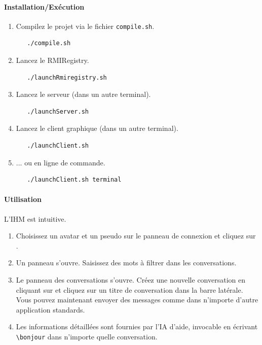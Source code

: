 \documentclass[11pt,dvipsnames,svgnames]{report}
\begin{document}
\paragraph*{Installation/Exécution}
\begin{enumerate}
\item Compilez le projet via le fichier \texttt{compile.sh}.
\begin{lstlisting}
   ./compile.sh
\end{lstlisting}
\item Lancez le RMIRegistry.
\begin{lstlisting}
   ./launchRmiregistry.sh
\end{lstlisting}
\item Lancez le serveur (dans un autre terminal).
\begin{lstlisting}
   ./launchServer.sh
\end{lstlisting}
\item Lancez le client graphique (dans un autre terminal).
\begin{lstlisting}
   ./launchClient.sh 
\end{lstlisting}
\item ... ou en ligne de commande.
\begin{lstlisting}
   ./launchClient.sh terminal
\end{lstlisting}
\end{enumerate}

\paragraph*{Utilisation}
L'IHM est intuitive.

\begin{enumerate}
\item Choisissez un avatar et un pseudo sur le panneau de connexion et cliquez sur .
\item Un panneau s'ouvre. Saisissez des mots à filtrer dans les conversations.
\item Le panneau des conversations s'ouvre. Créez une nouvelle conversation en cliquant sur \menu{+} et cliquez sur un titre de conversation dans la barre latérale. Vous pouvez maintenant envoyer des messages comme dans n'importe d'autre application standards.
\item Les informations détaillées sont fournies par l'IA d'aide, invocable en écrivant \texttt{\textbackslash bonjour} dans n'importe quelle conversation.
\end{enumerate}
\end{document}
